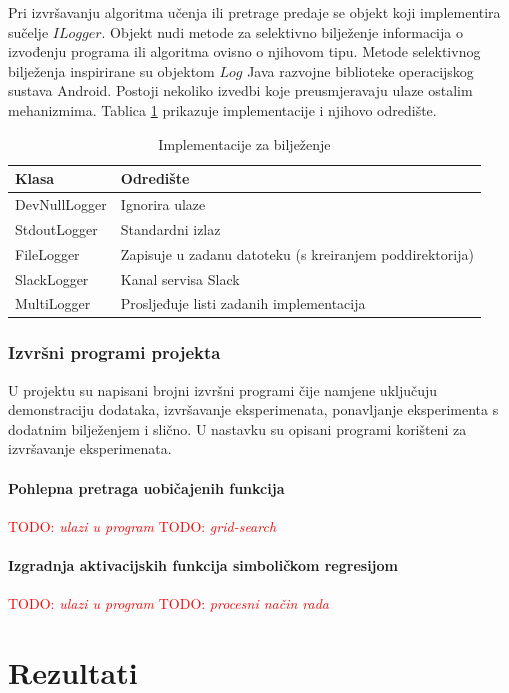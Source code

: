 \documentclass[times, utf8, numeric, diplomski]{fer}
\def\TODO#1{\noindent\textcolor{red}{TODO: \textit{#1}}\newline}
\def\todo#1{\TODO{#1}}
\begin{document}
Pri izvršavanju algoritma učenja ili pretrage predaje se objekt koji implementira sučelje $ILogger$. Objekt nudi metode za selektivno bilježenje informacija o izvođenju programa ili algoritma ovisno o njihovom tipu. Metode selektivnog bilježenja inspirirane su objektom $Log$ Java razvojne biblioteke operacijskog sustava Android. Postoji nekoliko izvedbi koje preusmjeravaju ulaze ostalim mehanizmima. Tablica \ref{tab:loggers} prikazuje implementacije i njihovo odredište.

\begin{table}[h]
\begin{tabular}{ll}
Klasa & Odredište \\
\hline
DevNullLogger & Ignorira ulaze \\
StdoutLogger & Standardni izlaz \\
FileLogger & Zapisuje u zadanu datoteku (s kreiranjem poddirektorija) \\
SlackLogger & Kanal servisa Slack \\
MultiLogger & Prosljeđuje listi zadanih implementacija
\end{tabular}
\centering
\caption{Implementacije za bilježenje}
\label{tab:loggers}
\end{table}

\subsection{Izvršni programi projekta}
U projektu su napisani brojni izvršni programi čije namjene uključuju demonstraciju dodataka, izvršavanje eksperimenata, ponavljanje eksperimenta s dodatnim bilježenjem i slično. U nastavku su opisani programi korišteni za izvršavanje eksperimenata.

\subsubsection{Pohlepna pretraga uobičajenih funkcija}
\todo{ulazi u program}
\todo{grid-search}

\subsubsection{Izgradnja aktivacijskih funkcija simboličkom regresijom}
\todo{ulazi u program}
\todo{procesni način rada}

\chapter{Rezultati}
\label{sec:rezultati}
\end{document}
